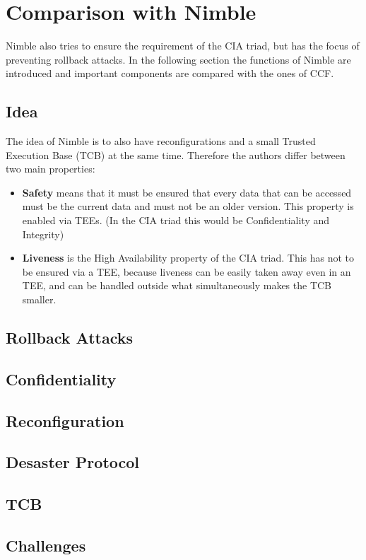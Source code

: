 \section{Comparison with Nimble}
Nimble \cite{Nimble} also tries to ensure the requirement of the CIA triad, but has the focus of preventing rollback attacks. In the following section the functions of Nimble are introduced and important components are compared with the ones of CCF.
\subsection{Idea}
The idea of Nimble is to also have reconfigurations and a small Trusted Execution Base (TCB) at the same time. Therefore the authors differ between two main properties:
	\begin{itemize}
		\item \textbf{Safety} means that it must be ensured that every data that can be accessed must be the current data and must not be an older version. This property is enabled via TEEs. (In the CIA triad this would be Confidentiality and Integrity)
		\item \textbf{Liveness} is the High Availability property of the CIA triad. This has not to be ensured via a TEE, because liveness can be easily taken away even in an TEE, and can be handled outside what simultaneously makes the TCB smaller.
	\end{itemize}
\subsection{Rollback Attacks}
\subsection{Confidentiality}
\subsection{Reconfiguration}
\subsection{Desaster Protocol}
\subsection{TCB}
\subsection{Challenges}